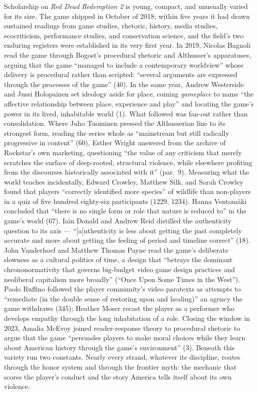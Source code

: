 Scholarship on \textit{Red Dead Redemption 2} is young, compact, and unusually varied for its size. The game shipped in October of 2018; within five years it had drawn sustained readings from game studies, rhetoric, history, media studies, ecocriticism, performance studies, and conservation science, and the field's two enduring registers were established in its very first year. In 2019, Nicolas Bagnoli read the game through Bogost's procedural rhetoric and Althusser's apparatuses, arguing that the game ``managed to include a contemporary worldview'' whose delivery is procedural rather than scripted: ``several arguments are expressed through the processes of the game'' (40). %
In the same year, Andrew Westerside and Jussi Holopainen set ideology aside for place, coining \textit{gameplace} to name ``the affective relationship between place, experience and play'' and locating the game's power in its lived, inhabitable world (1). %
What followed was fan-out rather than consolidation. Where Juho Tuominen pressed the Althusserian line to its strongest form, reading the series whole as ``mainstream but still radically progressive in content'' (60), Esther Wright answered from the archive of Rockstar's own marketing, questioning ``the value of any criticism that merely scratches the surface of deep-rooted, structural violence, while elsewhere profiting from the discourses historically associated with it'' (par.\ 9). %
Measuring what the world teaches incidentally, Edward Crowley, Matthew Silk, and Sarah Crowley found that players ``correctly identified more species'' of wildlife than non-players in a quiz of five hundred eighty-six participants (1229, 1234). Hanna Ventomäki concluded that ``there is no single form or role that nature is reduced to'' in the game's world (67). Iain Donald and Andrew Reid distilled the authenticity question to its axis --- ``[a]uthenticity is less about getting the past completely accurate and more about getting the feeling of period and timeline correct'' (18). %
John Vanderhoef and Matthew Thomas Payne read the game's deliberate slowness as a cultural politics of time, a design that ``betrays the dominant chrononormativity that governs big-budget video game design practices and neoliberal capitalism more broadly'' (``Once Upon Some Times in the West''). Paolo Ruffino followed the player community's video paratexts as attempts to ``remediate (in the double sense of restoring upon and healing)'' an agency the game withdraws (345); Heather Moser recast the player as a performer who develops empathy through the long inhabitation of a role. Closing the window in 2023, Amalia McEvoy joined reader-response theory to procedural rhetoric to argue that the game ``persuades players to make moral choices while they learn about American history through the game's environment'' (3). %
Beneath this variety run two constants. Nearly every strand, whatever its discipline, routes through the honor system and through the frontier myth: the mechanic that scores the player's conduct and the story America tells itself about its own violence.

